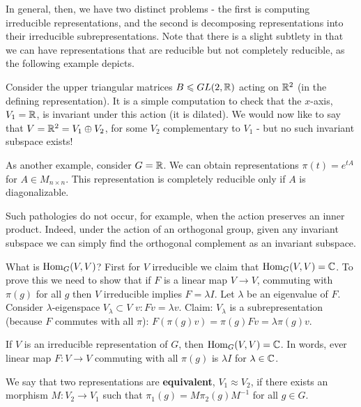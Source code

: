 \documentclass{../mathnotes}
\begin{document}
In general, then, we have two distinct problems - the first is computing irreducible representations, and the second is decomposing
representations into their irreducible subrepresentations.
Note that there is a slight subtlety in that we can have representations that are reducible
but not completely reducible, as the following example depicts.

\begin{exmp}
    Consider the upper triangular matrices $B\leqslant GL(2,\mathbb{R})$ acting on $\mathbb{R}^2$ (in the defining representation). It is a simple computation to check that the $x$-axis,
    $V_1=\mathbb{R}$, is invariant under this action (it is dilated). We would now like to say that $V=\mathbb{R}^2=V_1\oplus V_2$, for some $V_2$ complementary to $V_1$ - 
    but no such invariant subspace exists!

    As another example, consider $G=\mathbb{R}$. We can obtain representations $\pi(t)=e^{tA}$ for $A\in M_{n\times n}$. This representation
    is completely reducible only if $A$ is diagonalizable.

    Such pathologies do not occur, for example, when the action preserves an inner product. Indeed, under the action of an orthogonal group, given any invariant subspace
    we can simply find the orthogonal complement as an invariant subspace.
\end{exmp}

What is $\operatorname{Hom}_G(V,V)$? First for $V$ irreducible we claim that $\operatorname{Hom}_G(V,V)=\mathbb{C}$. To prove this we need to show that if $F$ is a linear map $V\to V$,
commuting with $\pi(g)$ for all $g$ then $V$ irreducible implies $F=\lambda I$. Let $\lambda$ be an eigenvalue of $F$. Consider $\lambda$-eigenspace $V_\lambda\subset V$
$v:Fv=\lambda v$. Claim: $V_\lambda$ is a subrepresentation (because $F$ commutes with all $\pi$): $F(\pi(g)v)=\pi(g)Fv=\lambda \pi(g)v$.

\begin{lem}
    If $V$ is an irreducible representation of $G$, then $\operatorname{Hom}_G(V,V)=\mathbb{C}$. In words, ever linear map $F:V\to V$ commuting
    with all $\pi(g)$ is $\lambda I$ for $\lambda\in\mathbb{C}$.
\end{lem}

\begin{defn}
    We say that two representations are \textbf{equivalent}, $V_1\approx V_2$, if there exists an morphism $M:V_2\to V_1$ such that $\pi_1(g)=M\pi_2(g)M^{-1}$
    for all $g\in G$.
\end{defn}
\end{document}
